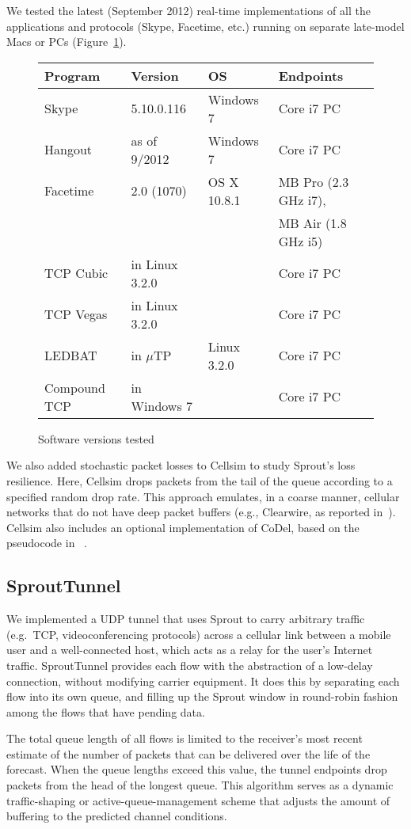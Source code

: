 We tested the latest (September 2012) real-time implementations of all
the applications and protocols (Skype, Facetime, etc.) running on
separate late-model Macs or PCs (Figure~\ref{f:software}).

\begin{figure}
  \caption{Software versions tested}
\hspace{\baselineskip}

\label{f:software}

\scriptsize
\noindent \begin{tabular}{|l|l|l|l|}
\hline
Program & Version & OS & Endpoints \\
\hline
\hline
Skype & 5.10.0.116 & Windows 7 & Core i7 PC \\
Hangout & as of 9/2012 & Windows 7 & Core i7 PC \\
Facetime & 2.0 (1070) & OS X 10.8.1 & MB Pro (2.3 GHz i7),\\
& & & MB Air (1.8 GHz i5) \\
TCP Cubic & in Linux 3.2.0 & & Core i7 PC \\
TCP Vegas & in Linux 3.2.0 & & Core i7 PC \\
LEDBAT & in $\mu$TP & Linux 3.2.0 & Core i7 PC \\
Compound TCP & in Windows 7 & & Core i7 PC \\
\hline
\end{tabular}
\end{figure}

We also added stochastic packet losses to Cellsim to study Sprout's
loss resilience. Here, Cellsim drops packets from the tail of the
queue according to a specified random drop rate.  This approach
emulates, in a coarse manner, cellular networks that do not have deep
packet buffers (e.g., Clearwire, as reported
in~\cite{Mahajan12}). Cellsim also includes an optional implementation
of CoDel, based on the pseudocode in ~\cite{CoDel}.

\subsection{SproutTunnel}

We implemented a UDP tunnel that uses Sprout to carry arbitrary
traffic (e.g.~TCP, videoconferencing protocols) across a cellular link
between a mobile user and a well-connected host, which acts as a relay
for the user's Internet traffic. SproutTunnel provides each flow with
the abstraction of a low-delay connection, without modifying carrier
equipment. It does this by separating each flow into its own queue,
and filling up the Sprout window in round-robin fashion among the
flows that have pending data.

The total queue length of all flows is limited to the receiver's most
recent estimate of the number of packets that can be delivered over
the life of the forecast. When the queue lengths exceed this value,
the tunnel endpoints drop packets from the head of the longest
queue. This algorithm serves as a dynamic traffic-shaping or
active-queue-management scheme that adjusts the amount of buffering to
the predicted channel conditions.

